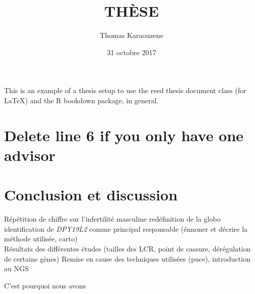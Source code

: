 \documentclass[12pt,twoside]{reedthesis}
\title{THÈSE}
\author{Thomas Karaouzene}
\date{31 octobre 2017}
\theoremstyle{definition}
\theoremstyle{definition}
\theoremstyle{remark}
\begin{document}
      \maketitle
  
  \frontmatter %
  \pagestyle{empty} %

  
      \begin{preface}
      This is an example of a thesis setup to use the reed thesis document
      class (for LaTeX) and the R bookdown package, in general.
    \end{preface}
  
      \hypersetup{linkcolor=black}
    \setcounter{tocdepth}{3}
    \tableofcontents
  
      \listoftables
  
      \listoffigures
  
  
  
  \mainmatter %
  \pagestyle{fancyplain} %

  \chapter{Delete line 6 if you only have one
  advisor}\label{delete-line-6-if-you-only-have-one-advisor}
  
  \chapter*{Conclusion et discussion}\label{conclusion-et-discussion}
  
  Répétition de chiffre sur l'infertilité masculine redéfinition de la
  globo\\
  identification de \emph{DPY19L2} comme principal responsable (énnoner et
  décrire la méthode utilisée, carto)\\
  Résultats des différentes études (tailles des LCR, point de cassure,
  dérégulation de certains gènes) Remise en cause des techniques utilisées
  (puce), introduction au NGS
  
  C'est pourquoi nous avons
  
  \newpage
  
\end{document}

